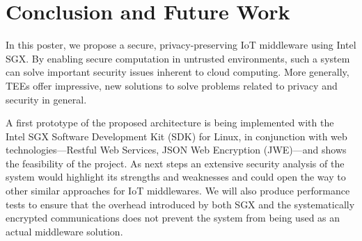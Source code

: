 \documentclass{sigchi}
\begin{document}
\section{Conclusion and Future Work}
In this poster, we propose a secure, privacy-preserving IoT middleware using Intel SGX. By enabling secure computation in untrusted environments, such a system can solve important security issues inherent to cloud computing. More generally, TEEs offer impressive, new solutions to solve problems related to privacy and security in general. 

A first prototype of the proposed architecture is being implemented with the Intel SGX Software Development Kit (SDK) for Linux, in conjunction with web technologies---Restful Web Services, JSON Web Encryption (JWE)---and shows the feasibility of the project. As next steps an extensive security analysis of the system would highlight its strengths and weaknesses and could open the way to other similar approaches for IoT middlewares. We will also produce performance tests to ensure that the overhead introduced by both SGX and the systematically encrypted communications does not prevent the system from being used as an actual middleware solution.



\balance{}



\end{document}
